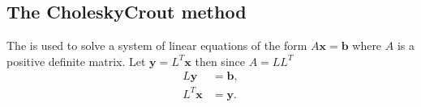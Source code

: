 \documentclass[letterpaper,10pt,english]{jupyterBook}
\begin{document}
\subsection{The Cholesky\sphinxhyphen{}Crout method}
\label{\detokenize{6_Direct_methods/6.3_Cholesky_decomposition:the-cholesky-crout-method}}\label{\detokenize{6_Direct_methods/6.3_Cholesky_decomposition:cholesky-crout-method-section}}
\sphinxAtStartPar
The  is used to solve a system of linear equations of the form \(A\mathbf{x}=\mathbf{b}\) where \(A\) is a positive definite matrix. Let \(\mathbf{y} = L^T \mathbf{x}\) then since \(A=LL^T\)
\begin{align*}
    L \mathbf{y} &= \mathbf{b}, \\
    L^T \mathbf{x} &= \mathbf{y}.
\end{align*}
\end{document}
